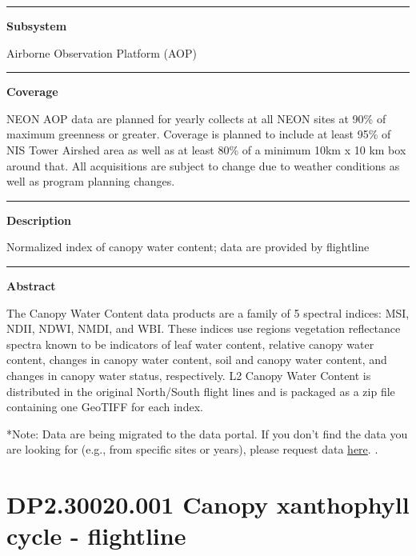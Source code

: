 \documentclass[]{article}
\begin{document}
\begin{center}\rule{0.5\linewidth}{\linethickness}\end{center}

\textbf{Subsystem}

Airborne Observation Platform (AOP)

\begin{center}\rule{0.5\linewidth}{\linethickness}\end{center}

\textbf{Coverage}

NEON AOP data are planned for yearly collects at all NEON sites at 90\%
of maximum greenness or greater. Coverage is planned to include at least
95\% of NIS Tower Airshed area as well as at least 80\% of a minimum
10km x 10 km box around that. All acquisitions are subject to change due
to weather conditions as well as program planning changes.

\begin{center}\rule{0.5\linewidth}{\linethickness}\end{center}

\textbf{Description}

Normalized index of canopy water content; data are provided by
flightline

\begin{center}\rule{0.5\linewidth}{\linethickness}\end{center}

\textbf{Abstract}

The Canopy Water Content data products are a family of 5 spectral
indices: MSI, NDII, NDWI, NMDI, and WBI. These indices use regions
vegetation reflectance spectra known to be indicators of leaf water
content, relative canopy water content, changes in canopy water content,
soil and canopy water content, and changes in canopy water status,
respectively. L2 Canopy Water Content is distributed in the original
North/South flight lines and is packaged as a zip file containing one
GeoTIFF for each index.

*Note: Data are being migrated to the data portal. If you don't find the
data you are looking for (e.g., from specific sites or years), please
request data
\href{http://www.neonscience.org/request-airborne-data}{here}. \newpage
.

\section{DP2.30020.001 Canopy xanthophyll cycle -
flightline}\label{dp2.30020.001-canopy-xanthophyll-cycle---flightline}
\end{document}
